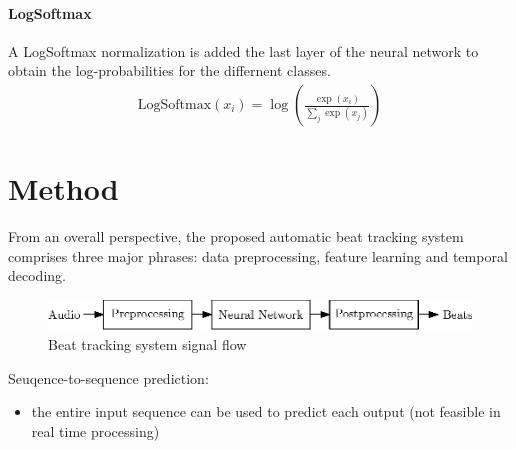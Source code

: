 \documentclass{scrartcl}
\begin{document}




\paragraph{LogSoftmax}

A LogSoftmax normalization is added the last layer of the neural network to obtain the log-probabilities for the differnent classes.
\begin{align}
\text{LogSoftmax}(x_i) = \log\left(\frac{\exp{(x_i)}}{\sum_j \exp(x_j)}\right)
\end{align} 

\newpage


\section{Method}

From an overall perspective, the proposed automatic beat tracking system comprises three major phrases: data preprocessing, feature learning and temporal decoding. 

\begin{figure}[htbp]
\centering
\includegraphics[scale=1.0]{figures/beat_tracking_system.eps}
\caption{Beat tracking system signal flow}
\label{fig:}
\end{figure}  


Seuqence-to-sequence prediction:
\begin{itemize}
\item the entire input sequence can be used to predict each output (not feasible in real time processing)
\end{itemize}
\end{document}
